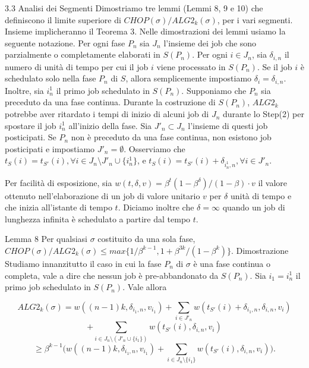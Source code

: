 \documentclass[12pt]{article}
\begin{document}
3.3 Analisi dei Segmenti
Dimostriamo tre lemmi (Lemmi 8, 9 e 10) che definiscono il limite superiore di $CHOP(\sigma)/ALG2_{k}(\sigma)$, per i vari segmenti. Insieme implicheranno il Teorema 3. Nelle dimostrazioni dei lemmi usiamo la seguente notazione. Per ogni fase $P_{n}$ sia $J_{n}$ l'insieme dei job che sono parzialmente o completamente elaborati in $S(P_{n})$. Per ogni $i \in J_{n}$, sia $\delta_{i,n}$ il numero di unità di tempo per cui il job $i$ viene processato in $S(P_{n})$. Se il job $i$ è schedulato solo nella fase $P_{n}$ di $S$, allora semplicemente impostiamo $\delta_{i} = \delta_{i,n}$. Inoltre, sia $i^{1}_{n}$ il primo job schedulato in $S(P_{n})$. Supponiamo che $P_{n}$ sia preceduto da una fase continua. Durante la costruzione di $S(P_{n})$, $ALG2_{k}$ potrebbe aver ritardato i tempi di inizio di alcuni job di $J_{n}$ durante lo Step(2) per spostare il job $i^{1}_{n}$ all'inizio della fase. Sia $J'_{n} \subset J_{n}$ l'insieme di questi job posticipati. Se $P_{n}$ non è preceduto da una fase continua, non esistono job posticipati e impostiamo $J'_{n} = \emptyset$. Osserviamo che $t_{S}(i) = t_{S'}(i), \forall i \in J_{n} \setminus J'_{n} \cup \{i^{1}_{n}\}$, e $t_{S}(i) = t_{S'}(i) + \delta_{i^{1}_{n},n}, \forall i \in J'_{n}$.

Per facilità di esposizione, sia $w(t, \delta, v) = \beta^{t} (1 - \beta^{\delta}) / (1 - \beta) \cdot v$ il valore ottenuto nell'elaborazione di un job di valore unitario $v$ per $\delta$ unità di tempo e che inizia all'istante di tempo $t$. Diciamo inoltre che $\delta = \infty$ quando un job di lunghezza infinita è schedulato a partire dal tempo $t$.

Lemma 8
Per qualsiasi $\sigma$ costituito da una sola fase, $CHOP(\sigma) / ALG2_{k}(\sigma) \leq max \{1 / \beta^{k - 1}, 1 + \beta^{3k} / (1 - \beta^{k})\}$.
Dimostrazione
Studiamo innanzitutto il caso in cui la fase $P_{n}$ di $\sigma$ è una fase continua o completa, vale a dire che nessun job è pre-abbandonato da $S(P_{n})$. Sia $i_{1} = i^{1}_{n}$ il primo job schedulato in $S(P_{n})$. Vale allora

$$ALG2_{k}(\sigma ) = w((n - 1)k, \delta_{i_{1} ,n}, v_{i_{1}}) + \sum_{i \in J'_{n}} w(t_{S'}(i)+ \delta_{i_{1} ,n}, \delta_{i ,n}, v_{i})$$
$$+ \sum_{i \in J_{n} \setminus (J'_{n} \cup\{i_{1}\})} w(t_{S'}(i), \delta_{i,n},v_{i})$$ 
$$\geq \beta^{k-1}\Bigg( w((n - 1)k, \delta_{i_{1},n}, v_{i_{1}} ) + \sum_{i \in J_{n} \setminus\{i_{1}\}} w(t_{S'}(i),\delta_{i,n}, v_{i})\Bigg).$$
\end{document}
